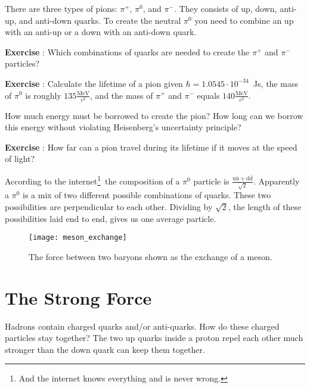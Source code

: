 There are three types of pions: $\pi^+$, $\pi^0$, and $\pi^-$. They consists of up, down, anti-up, and anti-down quarks. To create the neutral $\pi^0$ you need to combine an up with an anti-up or a down with an anti-down quark.

\begin{shaded}
\textbf{Exercise \theExercise {}} : Which combinations of quarks are needed to create the $\pi^+$ and $\pi^-$ particles?\footnotemark\end{shaded}
\begin{shaded}
\textbf{Exercise \theExercise {}} : Calculate the lifetime of a pion given $\hbar=1.0545 \cdot 10^{-34}$~Js, the mass of $\pi^0$ is roughly $135 \frac{\mbox{MeV}}{c^2}$, and the mass of $\pi^+$ and  $\pi^-$ equals $140 \frac{\mbox{MeV}}{c^2}$.

How much energy must be borrowed to create the pion? How long can we borrow this energy without violating Heisenberg's uncertainty principle?\end{shaded}
\begin{shaded}
\textbf{Exercise \theExercise {}} : How far can a pion travel during its lifetime if it moves at the speed of light?\end{shaded}

According to the internet\footnote{And the internet knows everything and is never wrong.}~the composition of a $\pi^0$ particle is $\frac{\mbox{u}\bar{\mbox{u}}+\mbox{d}\bar{\mbox{d}}}{\sqrt{2}}$. Apparently a $\pi^0$ is a mix of two different possible combinations of quarks. These two possibilities are perpendicular to each other. Dividing by $\sqrt{2}$, the length of these possibilities laid end to end, gives us one average particle.

\begin{figure}\begin{center}
\texttt{[image: meson\_exchange]}%
\caption{The force between two baryons shown as the exchange of a meson.}\label{fig:meson_exchange}
\end{center}\end{figure}

\section{The Strong Force}
Hadrons contain charged quarks and/or anti-quarks. How do these charged particles stay together? The two up quarks inside a proton repel each other much stronger than the down quark can keep them together.

